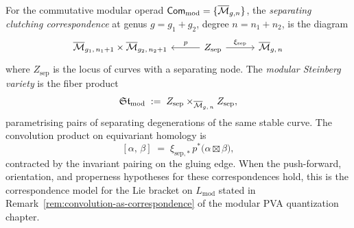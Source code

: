 \begin{construction}
\label{constr:modular-steinberg}
For the commutative modular operad
$\mathsf{Com}_{\mathrm{mod}} = \{\overline{\mathcal{M}}_{g,n}\}$, the
\emph{separating clutching correspondence} at genus
$g = g_1 + g_2$, degree $n = n_1 + n_2$, is the diagram
\[
\begin{tikzcd}[column sep=3em]
\overline{\cM}_{g_1,\, n_1+1} \times
\overline{\cM}_{g_2,\, n_2+1}
& \ar[l, "p"'] Z_{\mathrm{sep}}
 \ar[r, "\xi_{\mathrm{sep}}"] &
\overline{\cM}_{g,\,n}
\end{tikzcd}
\]
where $Z_{\mathrm{sep}}$ is the locus of curves with a
separating node. The \emph{modular Steinberg variety} is the
fiber product
\[
\mathfrak{St}_{\mathrm{mod}}
\;:=\;
Z_{\mathrm{sep}}
\times_{\overline{\mathcal{M}}_{g,\,n}}
Z_{\mathrm{sep}},
\]
parametrising pairs of separating degenerations of the same
stable curve. The convolution product on equivariant homology
is
\[
[\alpha,\, \beta]
\;=\;
\xi_{\mathrm{sep},\ast}\,
p^\ast\!
\bigl(\alpha \boxtimes \beta\bigr),
\]
contracted by the invariant pairing on the gluing edge.
When the push-forward, orientation, and properness hypotheses for these
correspondences hold, this is the correspondence model for the Lie
bracket on $L_{\mathrm{mod}}$ stated in
Remark~\textup{\ref{rem:convolution-as-correspondence}} of the modular
PVA quantization chapter.
\end{construction}

